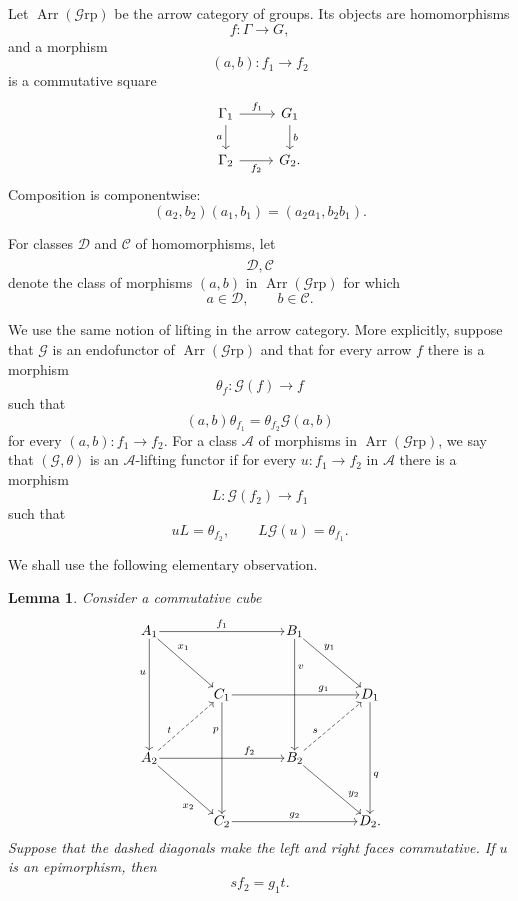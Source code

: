 \documentclass[10pt]{amsart}
\newtheorem{lemma}[theorem]{Lemma}
\renewcommand{\*}{\cdot {\dots} \cdot}
\newcommand{\?}[1]{\overset{?}{#1}}
\newcommand{\Grp}{\mathcal{G}\text{rp}}
\numberwithin{equation}{section}
\begin{document}
Let $\operatorname{Arr}(\Grp)$ be the arrow category of groups.
Its objects are homomorphisms
\[
f\colon\Gamma\longrightarrow G,
\]
and a morphism
\[
(a,b)\colon f_1\longrightarrow f_2
\]
is a commutative square
\[
\begin{tikzcd}
\Gamma_1 \arrow[r,"f_1"] \arrow[d,"a"']
    & G_1 \arrow[d,"b"]\\
\Gamma_2 \arrow[r,"f_2"']
    & G_2.
\end{tikzcd}
\]
Composition is componentwise:
\[
(a_2,b_2)(a_1,b_1)=(a_2a_1,b_2b_1).
\]

For classes $\mathcal D$ and $\mathcal C$ of homomorphisms, let
\[
\widehat{\mathcal D,\mathcal C}
\]
denote the class of morphisms $(a,b)$ in
$\operatorname{Arr}(\Grp)$ for which
\[
a\in\mathcal D,
\qquad
b\in\mathcal C.
\]

We use the same notion of lifting in the arrow category. More
explicitly, suppose that $\mathscr G$ is an endofunctor of
$\operatorname{Arr}(\Grp)$ and that for every arrow $f$ there is
a morphism
\[
\theta_f\colon\mathscr G(f)\longrightarrow f
\]
such that
\[
(a,b)\theta_{f_1}
=
\theta_{f_2}\mathscr G(a,b)
\]
for every $(a,b)\colon f_1\to f_2$. For a class $\mathcal A$ of
morphisms in $\operatorname{Arr}(\Grp)$, we say that
$(\mathscr G,\theta)$ is an $\mathcal A$-lifting functor if for every $u\colon f_1\longrightarrow f_2$ in $\mathcal A$ there is a morphism
\[
L\colon\mathscr G(f_2)\longrightarrow f_1
\]
such that
\[
uL=\theta_{f_2},
\qquad
L\mathscr G(u)=\theta_{f_1}.
\]

We shall use the following elementary observation.

\begin{lemma}\label{lem:cube-diagonals}
Consider a commutative cube
\[
\begin{tikzcd}[
  row sep=3.5em,
  column sep=3.8em,
  cells={nodes={inner sep=1pt}}
]
A_1
  \arrow[rr,"f_1"]
  \arrow[dd,"u"' {pos=0.30}]
  \arrow[dr,"x_1" {pos=0.30}]
&&
B_1
  \arrow[dd,"v" {pos=0.25}]
  \arrow[dr,"y_1" {pos=0.30}]
&
\\
&
C_1
  \arrow[rr,"g_1" {pos=0.72}]
  \arrow[dd,"p"' {pos=0.25}]
&&
D_1
  \arrow[dd,"q" {pos=0.65}]
\\
A_2
  \arrow[rr,swap,"f_2"' {pos=0.72}]
  \arrow[dr,"x_2"' {pos=0.72}]
  \arrow[ur,dashed,"t" {pos=0.30}]
&&
B_2
  \arrow[dr,swap, "y_2"' {pos=0.72}]
  \arrow[ur,dashed,"s" {pos=0.30}]
&
\\
&
C_2
  \arrow[rr,swap,"g_2"']
&&
D_2 .
\end{tikzcd}
\]
Suppose that the dashed diagonals make the left and right faces
commutative. If $u$ is an epimorphism, then
\[
sf_2=g_1t.
\]
\end{lemma}
\end{document}
